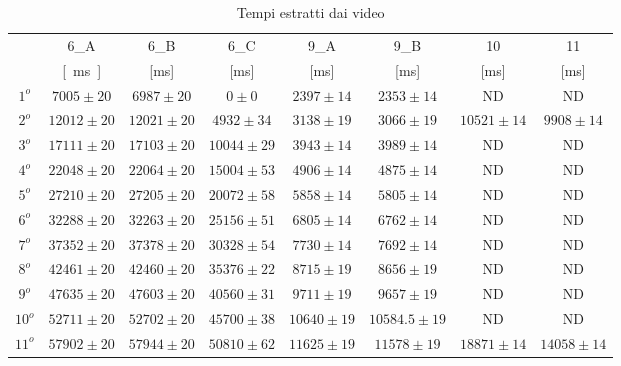 \documentclass[a4paper,11pt,oneside]{article}
\begin{document}
\begin{table}[h!]
{\begin{tabular}{|c|c|c|c|c|c|c|c|}
& 6_A & 6_B & 6_C & 9_A & 9_B & 10 & 11\\
& \si{[ms]} & [ms] & [ms] & [ms] & [ms] & [ms] & [ms]\\ \hline
{\rowcolor[rgb]{0.85,0.85,0.85}}$1^o$ & $7005 \pm 20$ & $6987 \pm 20$ & $0 \pm 0$ & $2397 \pm 14$ & $2353 \pm 14$ & ND & ND \\ \hline
$2^o$ & $12012 \pm 20$ & $12021 \pm 20$ & $4932 \pm 34$ & $3138 \pm 19$ & $3066 \pm 19$ & $10521 \pm 14$ & $9908 \pm 14$ \\ \hline
{\rowcolor[rgb]{0.85,0.85,0.85}}$3^o$ & $17111 \pm 20$ & $17103 \pm 20$ & $10044 \pm 29$ & $3943 \pm 14$ & $3989 \pm 14$ & ND & ND \\ \hline
$4^o$ & $22048 \pm 20$ & $22064 \pm 20$ & $15004 \pm 53$ & $4906 \pm 14$ & $4875 \pm 14$ & ND & ND \\ \hline
{\rowcolor[rgb]{0.85,0.85,0.85}}$5^o$ & $27210 \pm 20$ & $27205 \pm 20$ & $20072 \pm 58$ & $5858 \pm 14$ & $5805 \pm 14$ & ND & ND \\ \hline
$6^o$ & $32288 \pm 20$ & $32263 \pm 20$ & $25156 \pm 51$ & $6805 \pm 14$ & $6762 \pm 14$ & ND & ND \\ \hline
{\rowcolor[rgb]{0.85,0.85,0.85}}$7^o$ & $37352 \pm 20$ & $37378 \pm 20$ & $30328 \pm 54$ & $7730 \pm 14$ & $7692 \pm 14$ & ND & ND \\ \hline
$8^o$ & $42461 \pm 20$ & $42460 \pm 20$ & $35376 \pm 22$ & $8715 \pm 19$ & $8656 \pm 19$ & ND & ND \\ \hline
{\rowcolor[rgb]{0.85,0.85,0.85}}$9^o$ & $47635 \pm 20$ & $47603 \pm 20$ & $40560 \pm 31$ & $9711 \pm 19$ & $9657 \pm 19$ & ND & ND \\ \hline
$10^o$ & $52711 \pm 20$ & $52702 \pm 20$ & $45700 \pm 38$ & $10640 \pm 19$ & $10584.5 \pm 19$ & ND & ND \\ \hline
{\rowcolor[rgb]{0.85,0.85,0.85}}$11^o$ & $57902 \pm 20$ & $57944 \pm 20$ & $50810 \pm 62$ & $11625 \pm 19$ & $11578 \pm 19$ & $18871 \pm 14$ & $14058 \pm 14$ \\ \hline
\end{tabular}}
\caption{Tempi estratti dai video}
\label{tab:dati_semi_grezzi}
\end{table}
\end{document}
